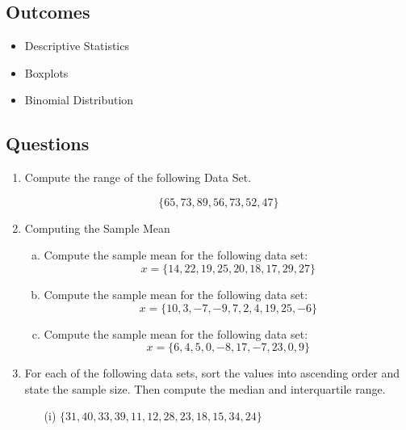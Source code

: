 \documentclass[a4paper,12pt]{article}
\begin{document}
\subsection*{Outcomes}
\begin{itemize}
    \item Descriptive Statistics
    \item Boxplots
    \item Binomial Distribution
\end{itemize}
\subsection*{Questions}	
\begin{enumerate}	
\item Compute the range of the following Data Set.

\[\{65,73,89,56,73,52,47\}\]


\item Computing the Sample Mean 
	
	
	\begin{enumerate}[(a)]
		\item Compute the sample mean for the following data set:\[x = \{ 14, 22, 19, 25, 20, 18, 17, 29, 27 \}\]
		
		
		
		
		\item Compute the sample mean for the following data set:
		\[x =\{10, 3, -7, -9, 7, 2, 4, 19, 25, -6\}\]
		
		
		
		
		\item Compute the sample mean for the following data set:
		\[ x =	\{6, 4, 5, 0, -8, 17, -7, 23, 0, 9\}\]
		
		
	\end{enumerate}

\item 	For each of the following data sets, sort the values into ascending order and state the sample size.
	Then compute the median and interquartile range.
	
	
	\begin{itemize}
		\item[(i)] $\{31, 40, 33, 39, 11, 12, 28, 23, 18, 15, 34, 24\}$ \smallskip
		

\end{itemize}
\end{enumerate}
\end{document}
